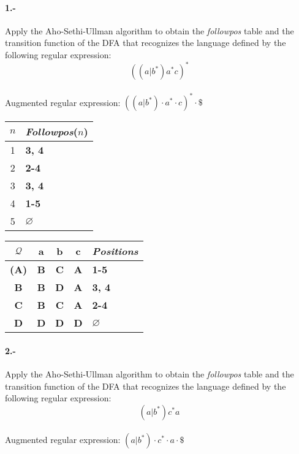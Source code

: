 \documentclass[11pt,a4paper,table,answers]{exam} %
\newcommand{\h}[1]{\ifprintanswers\textcolor{azul}{\bf#1}\else{\phantom{\bf#1}}\fi}
\newlength{\graphicheigth}
\newcommand{\myincludegraphicssol}[1]{%
    \sbox{\graphicbox}{%
        \begin{adjustbox}{max size={\textwidth}{\textheight}}
            \texttt{[image: \#1]}
        \end{adjustbox}
    }
    \settoheight{\graphicheigth}{\usebox{\graphicbox}}
    \addtolength{\graphicheigth}{4ex} %
    \ifprintanswers
        \begin{center}
            \usebox{\graphicbox}
        \end{center} 
    \else
        \makeemptybox{\graphicheigth}
    \fi
}
\begin{document}
\paragraph{1.-}\label{p1}
Apply the Aho-Sethi-Ullman algorithm to obtain the \emph{followpos} table and the transition function of the DFA that recognizes the language defined by the following regular expression:
\[
    ((a|b^*)a^*c)^*
\]
~\\
Augmented regular expression: \h{$ ((a|b^*)\cdot a^*\cdot c)^*\cdot \$  $} \\

\myincludegraphicssol{}
\begin{tabular} {c@{\hspace{4mm}}l}
\toprule %
$n$ & \emph{Followpos}($n$) \\
\midrule %
1 & \h{3, 4} \\ 
2 & \h{2-4} \\ 
3 & \h{3, 4} \\ 
4 & \h{1-5} \\ 
5 & \h{$\varnothing$} \\ 
\bottomrule %
\end{tabular}
\quad
{}
\begin{tabular} {c@{\hspace{4mm}}ccc@{\hspace{4mm}}l}
\toprule %
$\mathcal{Q}$ & a & b & c & \emph{Positions}\\ 
\midrule %
\h{(A)} & \h{B} & \h{C} & \h{A} & \h{1-5}\\ 
\h{B} & \h{B} & \h{D} & \h{A} & \h{3, 4}\\ 
\h{C} & \h{B} & \h{C} & \h{A} & \h{2-4}\\ 
\h{D} & \h{D} & \h{D} & \h{D} & \h{$\varnothing$}\\ 
\bottomrule %
\end{tabular}

\paragraph{2.-}\label{p2}
Apply the Aho-Sethi-Ullman algorithm to obtain the \emph{followpos} table and the transition function of the DFA that recognizes the language defined by the following regular expression:
\[
    (a|b^*)c^*a
\]
~\\
Augmented regular expression: \h{$ (a|b^*)\cdot c^*\cdot a\cdot \$  $} \\
\end{document}
